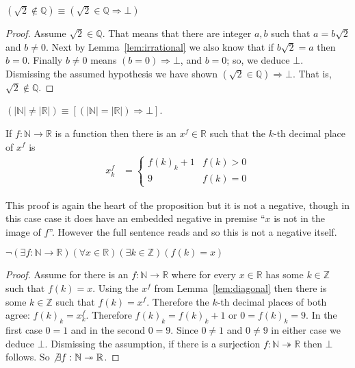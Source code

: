 \begin{proposition}
    $(\sqrt{2}\notin \mathbb{Q})\equiv (\sqrt{2}\in \mathbb{Q}\Rightarrow \bot)$
\end{proposition}
\begin{proof}
    Assume $\sqrt{2}\in \mathbb{Q}$.  That means that there are 
    integer $a,b$ such that $a=b\sqrt{2}$ and $b\neq 0$.
    Next by Lemma~\ref{lem:irrational} we also know 
    that if $b\sqrt{2}=a$ then $b=0$. 
    Finally $b\neq 0$ means $(b=0)\Rightarrow \bot$, 
    and $b=0$; so, we deduce $\bot$.
    Dismissing the assumed hypothesis we have shown 
    $(\sqrt{2}\in \mathbb{Q})\Rightarrow \bot$.
    That is, $\sqrt{2}\notin \mathbb{Q}$.
\end{proof}

\begin{proposition}
    $(|\mathbb{N}|\neq |\mathbb{R}|)\equiv [(|\mathbb{N}|=|\mathbb{R}|)\Rightarrow \bot]$. 
\end{proposition}

\begin{lemma}\label{lem:diagonal}
    If $f:\mathbb{N}\to \mathbb{R}$ is a function then there is 
    an $x^f\in \mathbb{R}$ such that the $k$-th decimal place of 
    $x^f$ is
    \begin{align*}
        x^f_k & = \left\{\begin{array}{cc}
            f(k)_k+1 & f(k)>0\\
            9 & f(k)=0
        \end{array}
        \right.
    \end{align*}
\end{lemma}

This proof is again the heart of the proposition but it is not a negative, 
though in this case case it does have an embedded negative in premise 
``$x$ is not in the image of $f$''.  However the full sentence reads 
 and so this is not a negative itself.

\begin{proposition}
    $\neg (\exists f:\mathbb{N}\to \mathbb{R})(\forall x\in \mathbb{R})(\exists k\in\mathbb{Z})(f(k)=x)$
\end{proposition}
\begin{proof}
    Assume for there is an $f:\mathbb{N}\to \mathbb{R}$ where 
    for every $x\in\mathbb{R}$ has some $k\in \mathbb{Z}$ such that $f(k)=x$.
    Using the $x^f$ from Lemma~\ref{lem:diagonal} then there is 
    some $k\in \mathbb{Z}$ such that $f(k)=x^f$.  Therefore 
    the $k$-th decimal places of both agree: $f(k)_k = x^f_k$.
    Therefore $f(k)_k=f(k)_k+1$ or $0=f(k)_k=9$.
    In the first case $0=1$ and in the second $0=9$.
    Since $0\neq 1$ and $0\neq 9$ in either case we deduce $\bot$.
    Dismissing the assumption, if there is a surjection $f:\mathbb{N}\twoheadrightarrow \mathbb{R}$
    then $\bot$ follows.  So $\not\exists f:\mathbb{N}\twoheadrightarrow \mathbb{R}$.
\end{proof}
